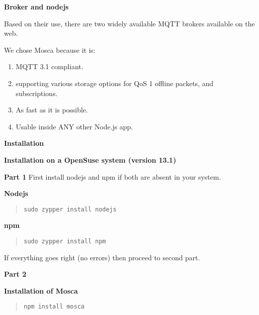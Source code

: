 \documentclass[16pt]{article}
\begin{document}
  

{\Large{\item\textbf{Broker and nodejs}}} 
 \vspace{0.5cm}

Based on their use, there are two widely available MQTT brokers
available on the web. 

We chose Mosca because it is: 

\begin{enumerate}

\item MQTT 3.1 compliant.
\item supporting various storage options for QoS 1 offline packets, and subscriptions.
\item As fast as it is possible.
\item Usable inside ANY other Node.js app.

\end{enumerate}
 \vspace{0.5cm}

{\Large{\textbf{Installation}}}


\textbf{Installation on a OpenSuse system (version
13.1)}

\textbf{Part 1} First install nodejs and npm if both are absent in your
system.

 \vspace{1cm}
 
\textbf{Nodejs}

\begin{quote}
\texttt{sudo zypper install nodejs}
\end{quote}

\textbf{npm}

\begin{quote}
\texttt{sudo zypper install npm}
\end{quote}

If everything goes right (no errors) then proceed to second part.
 \vspace{0.5cm}

\textbf{Part 2}

\textbf{Installation of Mosca}

\begin{quote}
\texttt{npm install mosca}
\end{quote}
\end{document}
